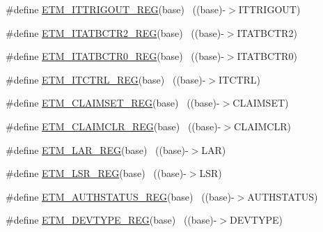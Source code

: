 \begin{DoxyCompactItemize}
\item 
\#define \hyperlink{group___e_t_m___register___accessor___macros_ga36065849905919cb02e4ff0a695478e6}{E\+T\+M\+\_\+\+I\+T\+T\+R\+I\+G\+O\+U\+T\+\_\+\+R\+EG}(base)                                ~((base)-\/$>$I\+T\+T\+R\+I\+G\+O\+UT)
\item 
\#define \hyperlink{group___e_t_m___register___accessor___macros_gabaaff853349c573dc5d808c1832ae593}{E\+T\+M\+\_\+\+I\+T\+A\+T\+B\+C\+T\+R2\+\_\+\+R\+EG}(base)                                ~((base)-\/$>$I\+T\+A\+T\+B\+C\+T\+R2)
\item 
\#define \hyperlink{group___e_t_m___register___accessor___macros_ga044ab1ed1903b83ec8bf8644fe891ff9}{E\+T\+M\+\_\+\+I\+T\+A\+T\+B\+C\+T\+R0\+\_\+\+R\+EG}(base)                                ~((base)-\/$>$I\+T\+A\+T\+B\+C\+T\+R0)
\item 
\#define \hyperlink{group___e_t_m___register___accessor___macros_ga869eff0ff03afcb538e3ec9f339a94b8}{E\+T\+M\+\_\+\+I\+T\+C\+T\+R\+L\+\_\+\+R\+EG}(base)                                      ~((base)-\/$>$I\+T\+C\+T\+RL)
\item 
\#define \hyperlink{group___e_t_m___register___accessor___macros_ga993d9a7923455e581d4b946e72f5ee53}{E\+T\+M\+\_\+\+C\+L\+A\+I\+M\+S\+E\+T\+\_\+\+R\+EG}(base)                                  ~((base)-\/$>$C\+L\+A\+I\+M\+S\+ET)
\item 
\#define \hyperlink{group___e_t_m___register___accessor___macros_ga7b9dde88cad5db5f12a6d8c4f4c365e1}{E\+T\+M\+\_\+\+C\+L\+A\+I\+M\+C\+L\+R\+\_\+\+R\+EG}(base)                                  ~((base)-\/$>$C\+L\+A\+I\+M\+C\+LR)
\item 
\#define \hyperlink{group___e_t_m___register___accessor___macros_gaae6bc29168049fdfd6475f2f0b0d02c2}{E\+T\+M\+\_\+\+L\+A\+R\+\_\+\+R\+EG}(base)                                            ~((base)-\/$>$L\+AR)
\item 
\#define \hyperlink{group___e_t_m___register___accessor___macros_ga9a048c56377ea08f363a29624cc701fd}{E\+T\+M\+\_\+\+L\+S\+R\+\_\+\+R\+EG}(base)                                            ~((base)-\/$>$L\+SR)
\item 
\#define \hyperlink{group___e_t_m___register___accessor___macros_ga3deff2d9aabe01be17e515265c5b505c}{E\+T\+M\+\_\+\+A\+U\+T\+H\+S\+T\+A\+T\+U\+S\+\_\+\+R\+EG}(base)                              ~((base)-\/$>$A\+U\+T\+H\+S\+T\+A\+T\+US)
\item 
\#define \hyperlink{group___e_t_m___register___accessor___macros_ga1383add0aed277ca21e88b6daaafaa76}{E\+T\+M\+\_\+\+D\+E\+V\+T\+Y\+P\+E\+\_\+\+R\+EG}(base)                                    ~((base)-\/$>$D\+E\+V\+T\+Y\+PE)

\end{DoxyCompactItemize}
